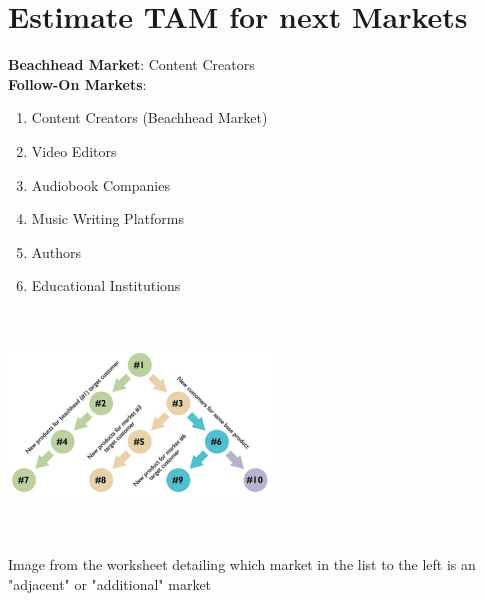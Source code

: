 \documentclass{article}
\begin{document}
\section{Estimate TAM for next Markets}
    \begin{multicols}{2}
        \raggedright \textbf{Beachhead Market}: Content Creators\\
        \textbf{Follow-On Markets}:
        \begin{enumerate}
            \item Content Creators (Beachhead Market)
            \item Video Editors
            \item Audiobook Companies
            \item Music Writing Platforms
            \item Authors
            \item Educational Institutions
        \end{enumerate}
            \includegraphics[width=7cm, height=6cm]{TAMGraph}
            \par{Image from the worksheet detailing which market in the list to the left is an "adjacent" or "additional" market}
    \end{multicols}
\end{document}
